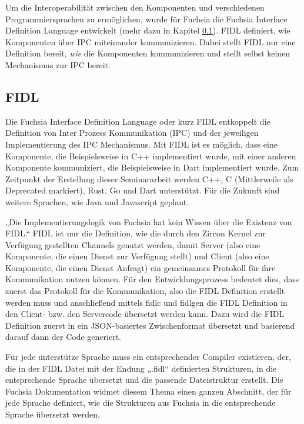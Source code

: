 \documentclass[a4paper]{scrartcl}
\begin{document}
Um die Interoperabilität zwischen den Komponenten und verschiedenen Programmiersprachen zu ermöglichen, wurde für Fuchsia die Fuchsia Interface Definition Language entwickelt (mehr dazu in Kapitel \ref{sec:FIDL}). FIDL definiert, wie Komponenten über IPC miteinander kommunizieren. Dabei stellt FIDL nur eine Definition bereit, \textit{wie} die Komponenten kommunizieren und stellt selbst keinen Mechanismus zur IPC bereit.

\subsection{FIDL}
\label{sec:FIDL}
Die Fuchsia Interface Definition Language oder kurz FIDL entkoppelt die Definition von Inter Prozess Kommunikation (IPC) und der jeweiligen Implementierung des IPC Mechanismus. Mit FIDL ist es möglich, dass eine Komponente, die Beispielsweise in C++ implementiert wurde, mit einer anderen Komponente kommuniziert, die Beispielsweise in Dart implementiert wurde. Zum Zeitpunkt der Erstellung dieser Seminararbeit werden C++, C (Mittlerweile als Deprecated markiert), Rust, Go und Dart unterstützt. Für die Zukunft sind weitere Sprachen, wie Java und Javascript geplant. \cite{Fuchsia.FIDLOverview}

„Die Implementierungslogik von Fuchsia hat kein Wissen über die Existenz von FIDL.“ \cite{Fuchsia.FIDLOverview} FIDL ist nur die Definition, wie die durch den Zircon Kernel zur Verfügung gestellten Channels genutzt werden, damit Server (also eine Komponente, die einen Dienst zur Verfügung stellt) und Client (also eine Komponente, die einen Dienst Anfragt) ein gemeinsames Protokoll für ihre Kommunikation nutzen können. Für den Entwicklungsprozess bedeutet dies, dass zuerst das Protokoll für die Kommunikation, also die FIDL Definition erstellt werden muss und anschließend mittels fidlc und fidlgen die FIDL Definition in den Client- bzw. den Servercode übersetzt werden kann. Dazu wird die FIDL Definition zuerst in ein JSON-basiertes Zwischenformat übersetzt und basierend darauf dann der Code generiert.

Für jede unterstütze Sprache muss ein entsprechender Compiler existieren, der, die in der FIDL Datei mit der Endung „.fidl“ definierten Strukturen, in die entsprechende Sprache übersetzt und die passende Dateistruktur erstellt. Die Fuchsia Dokumentation widmet diesem Thema einen ganzen Abschnitt, der für jede Sprache definiert, wie die Strukturen aus Fuchsia in die entsprechende Sprache übersetzt werden. \cite{Fuchsia.FIDLBindings.Overview}
\end{document}
